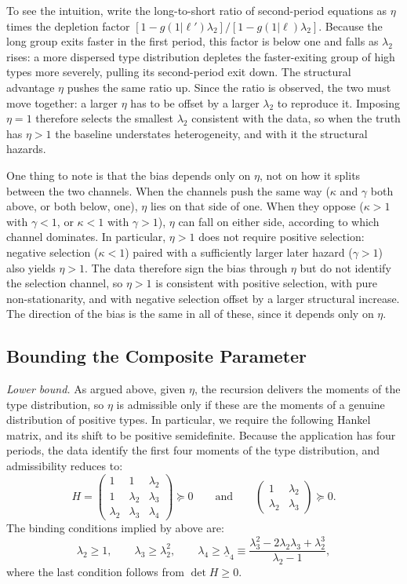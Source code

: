 \documentclass{div}
\begin{document}
To see the intuition, write the long-to-short ratio of second-period equations as $\eta$ times the depletion factor $[1-g(1|\ell')\lambda_2]/[1-g(1|\ell)\lambda_2]$. Because the long group exits faster in the first period, this factor is below one and falls as $\lambda_2$ rises: a more dispersed type distribution depletes the faster-exiting group of high types more severely, pulling its second-period exit down. The structural advantage $\eta$ pushes the same ratio up. Since the ratio is observed, the two must move together: a larger $\eta$ has to be offset by a larger $\lambda_2$ to reproduce it. Imposing $\eta=1$ therefore selects the smallest $\lambda_2$ consistent with the data, so when the truth has $\eta>1$ the baseline understates heterogeneity, and with it the structural hazards.

One thing to note is that the bias depends only on $\eta$, not on how it splits between the two channels. When the channels push the same way ($\kappa$ and $\gamma$ both above, or both below, one), $\eta$ lies on that side of one. When they oppose ($\kappa>1$ with $\gamma<1$, or $\kappa<1$ with $\gamma>1$), $\eta$ can fall on either side, according to which channel dominates. In particular, $\eta>1$ does not require positive selection: negative selection ($\kappa<1$) paired with a sufficiently larger later hazard ($\gamma>1$) also yields $\eta>1$. The data therefore sign the bias through $\eta$ but do not identify the selection channel, so $\eta>1$ is consistent with positive selection, with pure non-stationarity, and with negative selection offset by a larger structural increase. The direction of the bias is the same in all of these, since it depends only on $\eta$.


\subsection{Bounding the Composite Parameter}

\textit{Lower bound.} As argued above, given $\eta$, the recursion delivers the moments of the type distribution, so $\eta$ is admissible only if these are the moments of a genuine distribution of positive types. In particular, we require the following Hankel matrix, and its shift to be positive semidefinite. Because the application has four periods, the data identify the first four moments of the type distribution, and admissibility reduces to:
\[
  H=\begin{pmatrix} 1 & 1 & \lambda_2 \\ 1 & \lambda_2 & \lambda_3 \\ \lambda_2 & \lambda_3 & \lambda_4 \end{pmatrix}\succeq 0
  \qquad\text{and}\qquad
  \begin{pmatrix} 1 & \lambda_2 \\ \lambda_2 & \lambda_3 \end{pmatrix}\succeq 0 .
\]
The binding conditions implied by above are:
\[
  \lambda_2 \ge 1, \qquad \lambda_3 \ge \lambda_2^2, \qquad   \lambda_4 \ge \underline{\lambda}_4 \equiv \frac{\lambda_3^2 - 2\lambda_2\lambda_3 + \lambda_2^3}{\lambda_2 - 1},
\]
where the last condition follows from $ \det H \ge 0$.
\end{document}
